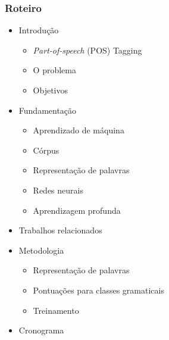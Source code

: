 \documentclass[10pt]{beamer}
\begin{document}
\begin{frame}
  \frametitle{Roteiro}


  \begin{itemize}

  \vspace{-1em}

    \item Introdução
    
    \begin{itemize}
      \item[\ ] \textit{Part-of-speech} (POS) Tagging 
      \item[\ ] O problema
      \item[\ ] Objetivos
    \end{itemize}


    \color{gray}
    \item[\color{gray}{$\bullet$}] Fundamentação

    \begin{itemize}
      \color{gray}
      \item[\ ] Aprendizado de máquina
      \item[\ ] Córpus
      \item[\ ] Representação de palavras
      \item[\ ] Redes neurais
      \item[\ ] Aprendizagem profunda
    \end{itemize}


    \color{gray}
    \item[\color{gray}{$\bullet$}] Trabalhos relacionados

    \color{gray}
    \item[\color{gray}{$\bullet$}] Metodologia

    \begin{itemize}
      \color{gray}
      \item[\ ] Representação de palavras
      \item[\ ] Pontuações para classes gramaticais
      \item[\ ] Treinamento
    \end{itemize}

    \color{gray}
    \item[\color{gray}{$\bullet$}] Cronograma

  \end{itemize}

\end{frame}
\end{document}
